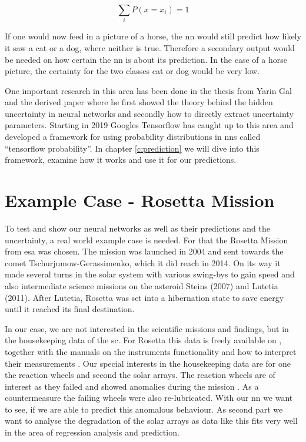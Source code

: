 \begin{equation}
\sum_i P(x=x_i)=1
\end{equation}

If one would now feed in a picture of a horse, the \ac{nn} would still predict how likely it saw a cat or a dog, where neither is true. Therefore a secondary output would be needed on how certain the \ac{nn} is about its prediction. In the case of a horse picture, the certainty for the two classes cat or dog would be very low.

One important research in this area has been done in the thesis from Yarin Gal \cite{yarin-thesis} and the derived paper \cite{yarin-dropout} where he first showed the theory behind the hidden uncertainty in neural networks and secondly how to directly extract uncertainty parameters. \newline
Starting in 2019 Googles Tensorflow \cite{tf-web} has caught up to this area and developed a framework for using probability distributions in \acp{nn} called \enquote{tensorflow probability}. In chapter \ref{c:prediction} we will dive into this framework, examine how it works and use it for our predictions.

\section{Example Case - Rosetta Mission}
To test and show our neural networks as well as their predictions and the uncertainty, a real world example case is needed. For that the Rosetta Mission \cite{rosetta-url} from \ac{esa} was chosen. The mission was launched in 2004 and sent towards the comet Tschurjumow-Gerassimenko, which it did reach in 2014. On its way it made several turns in the solar system with various swing-bys to gain speed and also intermediate science missions on the asteroid Steins (2007) and Lutetia (2011). After Lutetia, Rosetta was set into a hibernation state to save energy until it reached its final destination.

In our case, we are not interested in the scientific missions and findings, but in the housekeeping data of the \ac{sc}. For Rosetta this data is freely available on \cite{rosetta-data}, together with the manuals on the instruments functionality and how to interpret their measurements \cite{rosetta-manual}. \newline
Our special interests in the housekeeping data are for one the reaction wheels and second the solar arrays. The reaction wheels are of interest as they failed and showed anomalies during the mission \cite{rosetta-maintenance}. As a countermeasure the failing wheels were also re-lubricated. With our \ac{nn} we want to see, if we are able to predict this anomalous behaviour. \newline
As second part we want to analyse the degradation of the solar arrays as data like this fits very well in the area of regression analysis and prediction.

